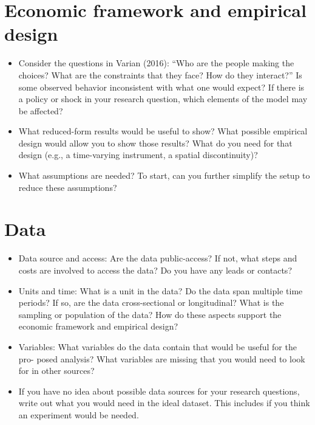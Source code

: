 \section{ Economic framework and empirical design} \label{section:efed} 

\begin{itemize}
	\item Consider the questions in Varian (2016): “Who are the people making the choices?
	What are the constraints that they face? How do they interact?” Is some observed
	behavior inconsistent with what one would expect? If there is a policy or shock
	in your research question, which elements of the model may be affected?
	\item What reduced-form results would be useful to show? What possible empirical
	design would allow you to show those results? What do you need for that design
	(e.g., a time-varying instrument, a spatial discontinuity)?
	\item What assumptions are needed? To start, can you further simplify the setup to
	reduce these assumptions?
\end{itemize}


\section{ Data} \label{section:data} 

\begin{itemize}
	\item Data source and access: Are the data public-access? If not, what steps and costs
	are involved to access the data? Do you have any leads or contacts?
	\item Units and time: What is a unit in the data? Do the data span multiple time
	periods? If so, are the data cross-sectional or longitudinal? What is the sampling
	or population of the data? How do these aspects support the economic framework
	and empirical design?
	\item Variables: What variables do the data contain that would be useful for the pro-
	posed analysis? What variables are missing that you would need to look for in
	other sources?
	\item If you have no idea about possible data sources for your research questions, write
	out what you would need in the ideal dataset. This includes if you think an
	experiment would be needed.
\end{itemize}




\singlespacing

%

\pagebreak
\renewcommand*{\thepage}{A.\arabic{page}}
\setcounter{page}{0}
\setcounter{equation}{0}
\renewcommand{\theequation}{A.\arabic{equation}}
\setcounter{section}{0}
\renewcommand{\thesection}{A.\arabic{section}}
\renewcommand{\thefigure}{A.\arabic{figure}}
\setcounter{figure}{0}
\renewcommand{\thetable}{A.\arabic{table}}
\setcounter{table}{0}
\thispagestyle{empty}


